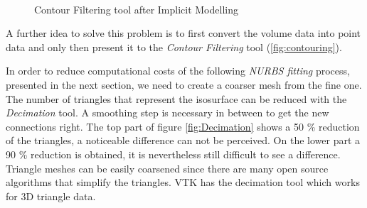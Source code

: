 \begin{figure}
\centering
   \\
   \caption{Contour Filtering tool after Implicit Modelling}
   \label{fig:contouring}
\end{figure}

A further idea to solve this problem is to first convert the volume data into point data
and only then present it to the \textit{Contour Filtering} tool (\autoref{fig:contouring}).

In order to reduce computational costs of the following \textit{NURBS fitting} process, presented in the next section, we need to create a coarser mesh from the fine one. The number of triangles that represent the
isosurface can be reduced with the \textit{Decimation} tool. A smoothing step is necessary in between
to get the new connections right. The top part of figure \ref{fig:Decimation} shows a 50 \% reduction of the
triangles, a noticeable difference can not be perceived. On the lower part a 90 \% reduction is
obtained, it is nevertheless still difficult to see a difference. Triangle meshes can be easily
coarsened since there are many open source algorithms that simplify the triangles. VTK has the
decimation tool which works for 3D triangle data.

